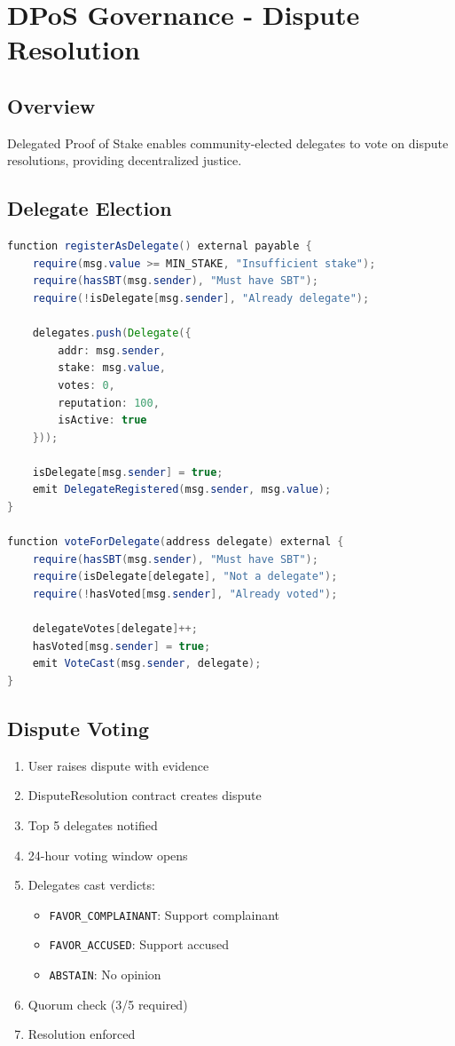 \section{DPoS Governance - Dispute Resolution}

\subsection{Overview}

Delegated Proof of Stake enables community-elected delegates to vote on dispute resolutions, providing decentralized justice.

\subsection{Delegate Election}

\begin{lstlisting}[language=Java, caption=DPoS Delegate Registration]
function registerAsDelegate() external payable {
    require(msg.value >= MIN_STAKE, "Insufficient stake");
    require(hasSBT(msg.sender), "Must have SBT");
    require(!isDelegate[msg.sender], "Already delegate");
    
    delegates.push(Delegate({
        addr: msg.sender,
        stake: msg.value,
        votes: 0,
        reputation: 100,
        isActive: true
    }));
    
    isDelegate[msg.sender] = true;
    emit DelegateRegistered(msg.sender, msg.value);
}

function voteForDelegate(address delegate) external {
    require(hasSBT(msg.sender), "Must have SBT");
    require(isDelegate[delegate], "Not a delegate");
    require(!hasVoted[msg.sender], "Already voted");
    
    delegateVotes[delegate]++;
    hasVoted[msg.sender] = true;
    emit VoteCast(msg.sender, delegate);
}
\end{lstlisting}

\subsection{Dispute Voting}

\begin{enumerate}
    \item User raises dispute with evidence
    \item DisputeResolution contract creates dispute
    \item Top 5 delegates notified
    \item 24-hour voting window opens
    \item Delegates cast verdicts:
    \begin{itemize}
        \item \texttt{FAVOR\_COMPLAINANT}: Support complainant
        \item \texttt{FAVOR\_ACCUSED}: Support accused
        \item \texttt{ABSTAIN}: No opinion
    \end{itemize}
    \item Quorum check (3/5 required)
    \item Resolution enforced
\end{enumerate}

